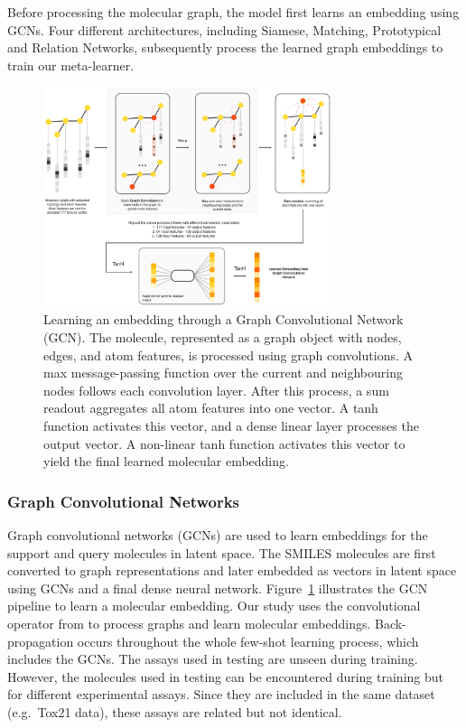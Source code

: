 \documentclass[journal=jcisd8,manuscript=article]{achemso} %
\begin{document}
Before processing the molecular graph, the model first learns an embedding using GCNs. Four different architectures, including Siamese, Matching, Prototypical and Relation Networks, subsequently process the learned graph embeddings to train our meta-learner.

\begin{figure}[ht!]
    \centering
    \includegraphics[width=0.75\textwidth]{img/DVGCNArchi.png}
    \caption{Learning an embedding through a Graph Convolutional Network (GCN). The molecule, represented as a graph object with nodes, edges, and atom features, is processed using graph convolutions. A max message-passing function over the current and neighbouring nodes follows each convolution layer. After this process, a sum readout aggregates all atom features into one vector. A tanh function activates this vector, and a dense linear layer processes the output vector. A non-linear tanh function activates this vector to yield the final learned molecular embedding.}
    \label{fig:dvgcnarchi}
\end{figure}

\subsubsection{Graph Convolutional Networks}

Graph convolutional networks (GCNs) are used to learn embeddings for the support and query molecules in latent space. The SMILES molecules are first converted to graph representations and later embedded as vectors in latent space using GCNs and a final dense neural network. Figure~\ref{fig:dvgcnarchi} illustrates the GCN pipeline to learn a molecular embedding. Our study uses the convolutional operator from \citet{kipf2016semi} to process graphs and learn molecular embeddings. Back-propagation occurs throughout the whole few-shot learning process, which includes the GCNs. The assays used in testing are unseen during training. However, the molecules used in testing can be encountered during training but for different experimental assays. Since they are included in the same dataset (e.g.\ Tox21 data), these assays are related but not identical.
\end{document}
